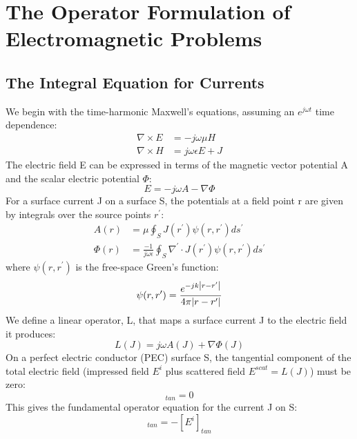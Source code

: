 \documentclass[11pt,a4paper]{article}
\begin{document}
\section{The Operator Formulation of Electromagnetic Problems}
\subsection{The Integral Equation for Currents}

We begin with the time-harmonic Maxwell's equations, assuming an \(e^{j\omega t}\) time dependence:
\begin{align}
    \nabla\times E &= -j\omega\mu H \\
    \nabla\times H &= j\omega\epsilon E+J
\end{align}
The electric field E can be expressed in terms of the magnetic vector potential A and the scalar electric potential \(\Phi\):
\begin{equation}
    E=-j\omega A-\nabla\Phi
\end{equation}
For a surface current J on a surface S, the potentials at a field point r are given by integrals over the source points \(r^{\prime}\):
\begin{align}
    A(r) &= \mu\oint_{S}J(r^{\prime})\psi(r,r^{\prime})ds^{\prime} \\
    \Phi(r) &= \frac{-1}{j\omega\epsilon}\oint_{S}\nabla^{\prime}\cdot J(r^{\prime})\psi(r,r^{\prime})ds^{\prime}
\end{align}
where \(\psi(r,r^{\prime})\) is the free-space Green's function:
\begin{equation}
    \psi(r,r^{\prime})=\frac{e^{-jk\abs{r-r^{\prime}}}}{4\pi\abs{r-r^{\prime}}}
\end{equation}
We define a linear operator, L, that maps a surface current J to the electric field it produces:
\begin{equation}
    L(J)=j\omega A(J)+\nabla\Phi(J)
\end{equation}
On a perfect electric conductor (PEC) surface S, the tangential component of the total electric field (impressed field \(E^{i}\) plus scattered field \(E^{scat}=L(J)\)) must be zero:
\begin{equation}
    [E^{i}+L(J)]_{tan}=0
\end{equation}
This gives the fundamental operator equation for the current J on S:
\begin{equation}
    [L(J)]_{tan}=-[E^{i}]_{tan}
\end{equation}
\end{document}
